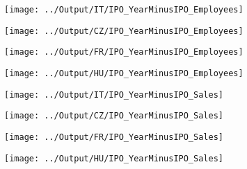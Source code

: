 \documentclass[12pt,notitlepage]{article}
\begin{document}
\begin{table}[htpb]
    \centering
    \caption{Sample Comparison - Hungary}
    \label{tab:my_label}
\end{table}

\begin{table}[htpb]
    \centering
    \caption{Sample Comparison - Czech Republic}
    \label{tab:my_label}
\end{table}



\begin{figure}[htpb]
\centering
\caption{IPO and Number of Employees}
\begin{subfigure}{.49\textwidth}
    \centering
 \texttt{[image: ../Output/IT/IPO\_YearMinusIPO\_Employees]}
\end{subfigure}%
\begin{subfigure}{.49\textwidth}
    \centering
 \texttt{[image: ../Output/CZ/IPO\_YearMinusIPO\_Employees]}
\end{subfigure}
\begin{subfigure}{.49\textwidth}
    \centering
 \texttt{[image: ../Output/FR/IPO\_YearMinusIPO\_Employees]}
\end{subfigure}%
\begin{subfigure}{.49\textwidth}
    \centering
 \texttt{[image: ../Output/HU/IPO\_YearMinusIPO\_Employees]}
\end{subfigure}
\end{figure}


\begin{figure}[htpb]
\centering
\caption{IPO and Sales}
\begin{subfigure}{.49\textwidth}
    \centering
 \texttt{[image: ../Output/IT/IPO\_YearMinusIPO\_Sales]}
\end{subfigure}%
\begin{subfigure}{.49\textwidth}
    \centering
 \texttt{[image: ../Output/CZ/IPO\_YearMinusIPO\_Sales]}
\end{subfigure}
\begin{subfigure}{.49\textwidth}
    \centering
 \texttt{[image: ../Output/FR/IPO\_YearMinusIPO\_Sales]}
\end{subfigure}%
\begin{subfigure}{.49\textwidth}
    \centering
 \texttt{[image: ../Output/HU/IPO\_YearMinusIPO\_Sales]}
\end{subfigure}
\end{figure}
\end{document}

